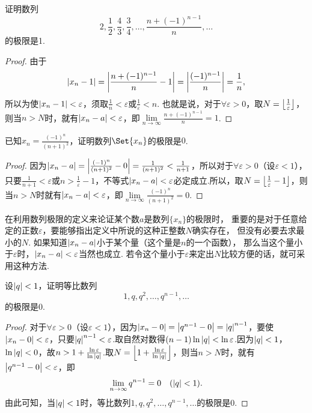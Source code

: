 \begin{example}
证明数列\[
2,\frac{1}{2},\frac{4}{3},\frac{3}{4},\dotsc,\frac{n+(-1)^{n-1}}{n},\dotsc
\]的极限是1.
\begin{proof}
由于\[
\abs{x_n - 1}
= \abs{\frac{n+(-1)^{n-1}}{n}-1}
= \abs{\frac{(-1)^{n-1}}{n}}
= \frac{1}{n},
\]所以为使\(\abs{x_n - 1} < \varepsilon\)，须取\(\frac{1}{n} < \varepsilon\)或\(\frac{1}{\varepsilon} < n\).
也就是说，对于\(\forall \varepsilon > 0\)，取\(N = \floor*{\frac{1}{\varepsilon}}\)，则当\(n > N\)时，就有\(\abs{x_n - a} < \varepsilon\)，即\(\lim\limits_{n\to\infty}\frac{n+(-1)^{n-1}}{n}=1\).
\end{proof}
\end{example}

\begin{example}
已知\(x_n = \frac{(-1)^n}{(n+1)^2}\)，证明数列\(\Set{x_n}\)的极限是\(0\).
\begin{proof}
因为\(\abs{x_n - a} = \abs{\frac{(-1)^n}{(n+1)^2}-0} = \frac{1}{(n+1)^2} < \frac{1}{n+1}\)，所以对于\(\forall\varepsilon>0\)（设\(\varepsilon<1\)），只要\(\frac{1}{n+1}<\varepsilon\)或\(n>\frac{1}{\varepsilon}-1\)，不等式\(\abs{x_n-a}<\varepsilon\)必定成立.所以，取\(N=\floor*{\frac{1}{\varepsilon}-1}\)，则当\(n>N\)时就有\(\abs{x_n - a}<\varepsilon\)，即\(\lim\limits_{n\to\infty}\frac{(-1)^n}{(n+1)^2}=0\).
\end{proof}
\end{example}

在利用数列极限的定义来论证某个数\(a\)是数列\(\{x_n\}\)的极限时，
重要的是对于任意给定的正数\(\varepsilon\)，要能够指出定义中所说的这种正整数\(N\)确实存在，
但没有必要去求最小的\(N\).
如果知道\(\abs{x_n-a}\)小于某个量（这个量是\(n\)的一个函数），
那么当这个量小于\(\varepsilon\)时，\(\abs{x_n-a}<\varepsilon\)当然也成立.
若令这个量小于\(\varepsilon\)来定出\(N\)比较方便的话，就可采用这种方法.

\begin{example}
设\(\abs{q}<1\)，证明等比数列\[
1,q,q^2,\dotsc,q^{n-1},\dotsc
\]的极限是\(0\).
\begin{proof}
对于\(\forall\varepsilon>0\)（设\(\varepsilon<1\)），因为\(\abs{x_n-0}=\abs{q^{n-1}-0}=\abs{q}^{n-1}\)，要使\(\abs{x_n-0}<\varepsilon\)，只要\(\abs{q}^{n-1}<\varepsilon\).取自然对数得\((n-1)\ln\abs{q}<\ln\varepsilon\).因为\(\abs{q}<1\)，\(\ln\abs{q}<0\)，故\(n>1+\frac{\ln\varepsilon}{\ln\abs{q}}\).取\(N=\floor*{1+\frac{\ln\varepsilon}{\ln\abs{q}}}\)，则当\(n>N\)时，就有\(\abs{q^{n-1}-0}<\varepsilon\)，即
\begin{equation}
\lim\limits_{n\to\infty}q^{n-1}=0
\quad(\abs{q}<1).
\end{equation}
由此可知，当\(\abs{q}<1\)时，等比数列\(1,q,q^2,\dotsc,q^{n-1},\dotsc\)的极限是\(0\).
\end{proof}
\end{example}

